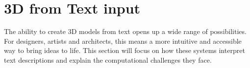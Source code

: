 \section{3D from Text input}\label{3d from text}

The ability to create 3D models from text opens up a wide range of possibilities. For designers, artists and architects, this means a more intuitive and accessible way to bring ideas to life. This section will focus on how these systems interpret text descriptions and explain the computational challenges they face.

%



